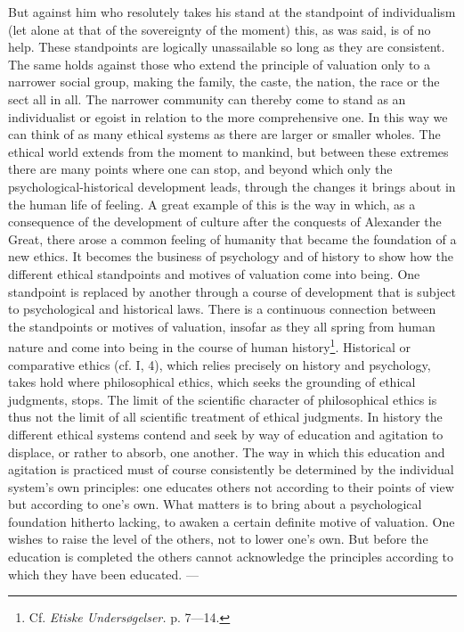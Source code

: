 \documentclass[12pt,a4paper,openany]{book}
\newcommand{\opage}[1]{\marginnote{\footnotesize\textit{[#1]}}}
\begin{document}
But against him who resolutely takes his stand at the standpoint of individualism (let alone at that
of the sovereignty of the moment) this, as was said, is of no help. These standpoints are logically
unassailable so long as they are consistent. The same holds against those who extend the principle of
valuation only to a narrower social group, making the family, the caste, the nation,
\opage{48}the race or the sect all in all. The narrower community can thereby come to stand as an
individualist or egoist in relation to the more comprehensive one. In this way we can think of as
many ethical systems as there are larger or smaller wholes. The ethical world extends from the moment
to mankind, but between these extremes there are many points where one can stop, and beyond which
only the psychological-historical development leads, through the changes it brings about in the
human life of feeling. A great example of this is the way in which, as a consequence of the
development of culture after the conquests of Alexander the Great, there arose a common feeling of
humanity that became the foundation of a new ethics. It becomes the business of psychology and of
history to show how the different ethical standpoints and motives of valuation come into being. One
standpoint is replaced by another through a course of development that is subject to psychological
and historical laws. There is a continuous connection between the standpoints or motives of
valuation, insofar as they all spring from human nature and come into being in the course of human
history\footnote[1]{Cf. \textit{Etiske Undersøgelser.} p. 7---14.}. Historical or comparative ethics
(cf. I, 4), which relies precisely on history and psychology, takes hold where philosophical ethics,
which seeks the grounding of ethical judgments, stops. The limit of the scientific character of
philosophical ethics is thus not the limit of all scientific treatment of ethical judgments. In
history the different ethical systems contend and seek by way of education and agitation to displace,
or rather to absorb, one another. The way in which this education and agitation is practiced must of
course consistently be determined by the individual system's own principles: one educates others not
according to their points of view but according to one's own. What matters is to bring about a
psychological foundation hitherto lacking, to awaken a certain definite motive of valuation. One
wishes to raise the level of the others, not to lower one's own. But before the education is
completed the others cannot acknowledge the principles according to which they have been educated.
---
\end{document}
